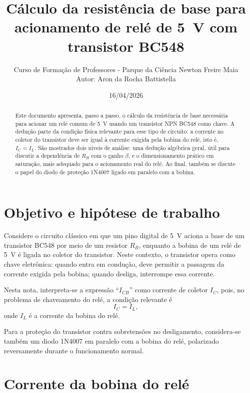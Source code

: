 \documentclass[12pt,a4paper]{article}
\title{Cálculo da resistência de base para acionamento de relé de \SI{5}{V} com transistor BC548}
\author{Curso de Formação de Professores - Parque da Ciência Newton Freire Maia\\Autor: Aron da Rocha Battistella}
\date{16/04/2026}
\newcommand{\Ic}{I_C}
\newcommand{\Il}{I_L}
\newcommand{\Rb}{R_B}
\begin{document}
\maketitle

\begin{abstract}
Este documento apresenta, passo a passo, o cálculo da resistência de base necessária para acionar um relé comum de \SI{5}{V} usando um transistor NPN BC548 como chave. A dedução parte da condição física relevante para esse tipo de circuito: a corrente no coletor do transistor deve ser igual à corrente exigida pela bobina do relé, isto é, $\Ic = \Il$. São mostrados dois níveis de análise: uma dedução algébrica geral, útil para discutir a dependência de $\Rb$ com o ganho $\beta$, e o dimensionamento prático em saturação, mais adequado para o acionamento real do relé. Ao final, também se discute o papel do diodo de proteção 1N4007 ligado em paralelo com a bobina.
\end{abstract}

\section{Objetivo e hipótese de trabalho}

Considere o circuito clássico em que um pino digital de \SI{5}{V} aciona a base de um transistor BC548 por meio de um resistor $\Rb$, enquanto a bobina de um relé de \SI{5}{V} é ligada no coletor do transistor. Neste contexto, o transistor opera como chave eletrônica: quando entra em condução, deve permitir a passagem da corrente exigida pela bobina; quando desliga, interrompe essa corrente.

\medskip

\noindent Nesta nota, interpreta-se a expressão ``$I_{CB}$'' como corrente de coletor $\Ic$, pois, no problema de chaveamento do relé, a condição relevante é
\begin{equation}
\Ic = \Il,
\end{equation}
onde $\Il$ é a corrente da bobina do relé.

\medskip

\noindent Para a proteção do transistor contra sobretensões no desligamento, considera-se também um diodo 1N4007 em paralelo com a bobina do relé, polarizado reversamente durante o funcionamento normal.

\section{Corrente da bobina do relé}
\end{document}
